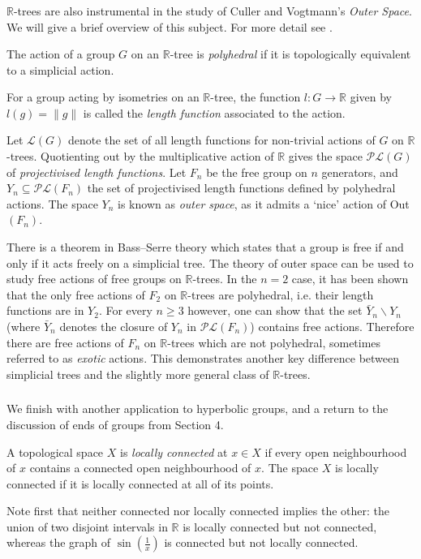 \subsubsection{}
$\mathbb{R}$-trees are also instrumental in the study of Culler and Vogtmann's \textit{Outer Space}. We will give a brief overview of this subject. For more detail see \cite[Section 2]{Shalen}.

\begin{definition}
    The action of a group $G$ on an $\mathbb{R}$-tree is \emph{polyhedral} if it is topologically equivalent to a simplicial action.
\end{definition}
\begin{definition}
    For a group acting by isometries on an $\mathbb{R}$-tree, the function $l:G\rightarrow\mathbb{R}$ given by $l(g)=\lVert g\rVert$ is called the \emph{length function} associated to the action.
\end{definition}

Let $\mathcal{L}(G)$ denote the set of all length functions for non-trivial actions of $G$ on $\mathbb{R}$-trees. Quotienting out by the multiplicative action of $\mathbb{R}$ gives the space $\mathcal{PL}(G)$ of \textit{projectivised length functions}. Let $F_n$ be the free group on $n$ generators, and $Y_n\subseteq \mathcal{PL}(F_n)$ the set of projectivised length functions defined by polyhedral actions. The space $Y_n$ is known as \textit{outer space}, as it admits a `nice' action of Out$(F_n)$. 

There is a theorem in Bass--Serre theory which states that a group is free if and only if it acts freely on a simplicial tree. The theory of outer space can be used to study free actions of free groups on $\mathbb{R}$-trees. In the $n=2$ case, it has been shown that the only free actions of $F_2$ on $\mathbb{R}$-trees are polyhedral, i.e. their length functions are in $Y_2$. For every $n\geq 3$ however, one can show that the set $\bar{Y}_n\backslash Y_n$ (where $\bar{Y}_n$ denotes the closure of $Y_n$ in $\mathcal{PL}(F_n)$) contains free actions. Therefore there are free actions of $F_n$ on $\mathbb{R}$-trees which are not polyhedral, sometimes referred to as \textit{exotic} actions. This demonstrates another key difference between simplicial trees and the slightly more general class of $\mathbb{R}$-trees.

\subsubsection{}
We finish with another application to hyperbolic groups, and a return to the discussion of ends of groups from Section 4.
\begin{definition}
    A topological space $X$ is \emph{locally connected} at $x\in X$ if every open neighbourhood of $x$ contains a connected open neighbourhood of $x$. The space $X$ is locally connected if it is locally connected at all of its points.
\end{definition}
Note first that neither connected nor locally connected implies the other: the union of two disjoint intervals in $\mathbb{R}$ is locally connected but not connected, whereas the graph of $\sin(\frac{1}{x})$ is connected but not locally connected.

